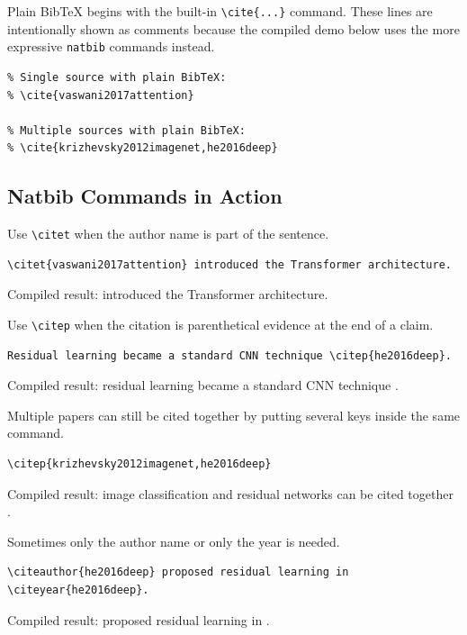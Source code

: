 \documentclass[11pt,a4paper]{article}
\begin{document}
Plain BibTeX begins with the built-in \verb|\cite{...}| command. These lines
are intentionally shown as comments because the compiled demo below uses the
more expressive \texttt{natbib} commands instead.

\begin{verbatim}
% Single source with plain BibTeX:
% \cite{vaswani2017attention}

% Multiple sources with plain BibTeX:
% \cite{krizhevsky2012imagenet,he2016deep}
\end{verbatim}

\subsection{Natbib Commands in Action}

Use \verb|\citet| when the author name is part of the sentence.

\begin{verbatim}
\citet{vaswani2017attention} introduced the Transformer architecture.
\end{verbatim}

Compiled result: \citet{vaswani2017attention} introduced the Transformer
architecture.

Use \verb|\citep| when the citation is parenthetical evidence at the end of a
claim.

\begin{verbatim}
Residual learning became a standard CNN technique \citep{he2016deep}.
\end{verbatim}

Compiled result: residual learning became a standard CNN technique
\citep{he2016deep}.

Multiple papers can still be cited together by putting several keys inside the
same command.

\begin{verbatim}
\citep{krizhevsky2012imagenet,he2016deep}
\end{verbatim}

Compiled result: image classification and residual networks can be cited
together \citep{krizhevsky2012imagenet,he2016deep}.

Sometimes only the author name or only the year is needed.

\begin{verbatim}
\citeauthor{he2016deep} proposed residual learning in \citeyear{he2016deep}.
\end{verbatim}

Compiled result: \citeauthor{he2016deep} proposed residual learning in
\citeyear{he2016deep}.
\end{document}
